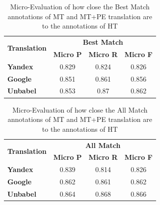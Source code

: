 \begin{table}[!htp]
\centering
\begin{tabular}{@{}lccc@{}}
\toprule
\multicolumn{1}{c}{\multirow{2}{*}{\textbf{Translation}}} & \multicolumn{3}{c}{\textbf{Best Match}}                            \\ \cmidrule(l){2-4}
\multicolumn{1}{c}{}          & \textbf{Micro P}     & \textbf{Micro R}      & \textbf{Micro F}          \\ \midrule
\textbf{Yandex}   & 0.829                & 0.824                 & 0.826                   \\ 

\textbf{Google}   & 0.851                & 0.861                 & 0.856                   \\ 

\textbf{Unbabel}  & 0.853                & 0.87                 & 0.862         \\ \bottomrule 

\end{tabular}%
\caption{Micro-Evaluation of how close the Best Match annotations of MT and MT+PE translation are to the annotations of HT}
\label{table: Results Best Match Micro}
\end{table}


\begin{table}[!htp]
\centering
\begin{tabular}{@{}lccc@{}}
\toprule
\multicolumn{1}{c}{\multirow{2}{*}{\textbf{Translation}}} & \multicolumn{3}{c}{\textbf{All Match}}                            \\ \cmidrule(l){2-4}
\multicolumn{1}{c}{}          & \textbf{Micro P}     & \textbf{Micro R}      & \textbf{Micro F}          \\ \midrule
\textbf{Yandex}   & 0.839                & 0.814                 & 0.826                   \\ 

\textbf{Google}   & 0.862                & 0.861                 & 0.862                   \\ 

\textbf{Unbabel}  & 0.864                & 0.868                 & 0.866         \\ \bottomrule 

\end{tabular}%
\caption{Micro-Evaluation of how close the All Match annotations of MT and MT+PE translation are to the annotations of HT}
\label{table: Results All Match Micro}
\end{table}


